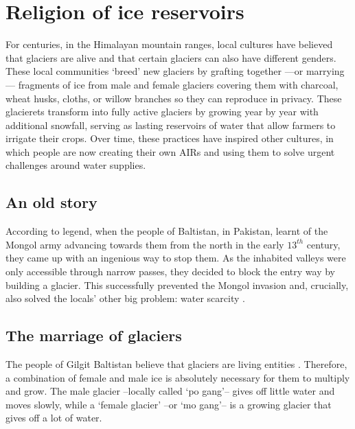 \chapter{Religion of ice reservoirs}


For centuries, in the Himalayan mountain ranges, local cultures have believed that glaciers are alive and that
certain glaciers can also have different genders. These local communities ‘breed’ new glaciers by grafting
together —or marrying— fragments of ice from male and female glaciers covering them with charcoal, wheat husks,
cloths, or willow branches so they can reproduce in privacy. These glacierets transform into fully active
glaciers by growing year by year with additional snowfall, serving as lasting reservoirs of water that allow farmers to irrigate their
crops. Over time, these practices have inspired other cultures, in which people are now creating their own
\ac{AIRs} and using them to solve urgent challenges around water supplies.

\section{An old story}

According to legend, when the people of Baltistan, in Pakistan, learnt of the Mongol army advancing towards
them from the north in the early $13^{th}$ century, they came up with an ingenious way to stop them. As the inhabited
valleys were only accessible through narrow passes, they decided to block the entry way by building a glacier.
This successfully prevented the Mongol invasion and, crucially, also solved the locals’ other big problem:
water scarcity \citep{khanMarriageGlaciersPrzekroj2020}.

\section{The marriage of glaciers}

The people of Gilgit Baltistan believe that glaciers are living entities
\citep{farazGlacierMarriagesPakistan2020, khanMarriageGlaciersPrzekroj2020}. Therefore, a combination of female
and male ice is absolutely necessary for them to multiply and grow. The male glacier –locally called ‘po gang’– gives off little water and moves slowly, while a ‘female glacier’ –or ‘mo gang’– is a growing glacier that
gives off a lot of water. 

